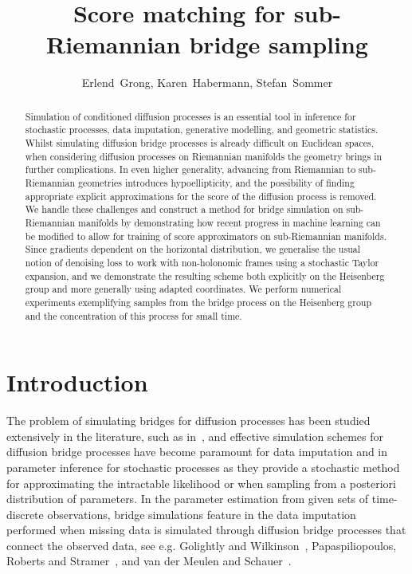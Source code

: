 \documentclass[10pt]{amsart}
\title{Score matching for sub-Riemannian bridge sampling}
\author[E.~Grong, K.~Habermann, S.~Sommer]{Erlend~Grong, Karen~Habermann, Stefan~Sommer}
\date{}
\theoremstyle{remark}
\numberwithin{equation}{section}
\begin{document}
\begin{abstract}
    Simulation of conditioned diffusion processes is an essential tool in inference for stochastic processes, data imputation, generative modelling, and geometric statistics. Whilst simulating diffusion bridge processes is already difficult on Euclidean spaces, when considering diffusion processes on Riemannian manifolds the geometry brings in further complications. In even higher generality, advancing from Riemannian to sub-Riemannian geometries introduces hypoellipticity, and the possibility of finding appropriate explicit approximations for the score of the diffusion process is removed. We handle these challenges and construct a method for bridge simulation on sub-Riemannian manifolds by demonstrating how recent progress in machine learning can be modified to allow for training of score approximators on sub-Riemannian manifolds. Since gradients dependent on the horizontal distribution, we generalise the usual notion of denoising loss to work with non-holonomic frames using a stochastic Taylor expansion, and we demonstrate the resulting scheme both explicitly on the Heisenberg group and more generally using adapted coordinates. We perform numerical experiments exemplifying samples from the bridge process on the Heisenberg group and the concentration of this process for small time.
\end{abstract}

\maketitle

\section{Introduction}

The problem of simulating bridges for diffusion processes has been studied extensively in the literature, such as in~\cite{BeskosPapaspiliopoulosRobertsFearnhead,delyonhu,bridgesim3,bladt2016,bridgesim6,bridgesim5}, and effective simulation schemes for diffusion bridge processes have become paramount for data imputation and in parameter inference for stochastic processes as they provide a stochastic method for approximating the intractable likelihood or when sampling from a posteriori distribution of parameters.
In the parameter estimation from given sets of time-discrete observations, bridge simulations feature in the data imputation performed when missing data is simulated through diffusion bridge processes that connect the observed data, see e.g. Golightly and Wilkinson~\cite{bayes0}, Papaspiliopoulos, Roberts and Stramer~\cite{bayes1}, and van der Meulen and Schauer~\cite{bayes2}.
\end{document}
